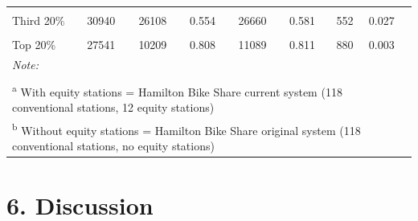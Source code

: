 \documentclass[]{elsarticle} %
\begin{document}
\begin{table}
{\begin{tabular}[t]{lccccccl}
\hspace{1em}\cellcolor{gray!6}{Second 20\%} & \cellcolor{gray!6}{33312} & \cellcolor{gray!6}{30507} & \cellcolor{gray!6}{0.555} & \cellcolor{gray!6}{31069} & \cellcolor{gray!6}{0.614} & \cellcolor{gray!6}{562} & \cellcolor{gray!6}{0.059}\\
\hspace{1em}Third 20\% & 30940 & 26108 & 0.554 & 26660 & 0.581 & 552 & 0.027\\
\hspace{1em}\cellcolor{gray!6}{Fourth 20\%} & \cellcolor{gray!6}{20185} & \cellcolor{gray!6}{6312} & \cellcolor{gray!6}{0.093} & \cellcolor{gray!6}{7435} & \cellcolor{gray!6}{0.096} & \cellcolor{gray!6}{1123} & \cellcolor{gray!6}{0.003}\\
\hspace{1em}Top 20\% & 27541 & 10209 & 0.808 & 11089 & 0.811 & 880 & 0.003\\
\bottomrule
\multicolumn{8}{l}{\rule{0pt}{1em}\textit{Note: }}\\
\multicolumn{8}{l}{\rule{0pt}{1em} }\\
\multicolumn{8}{l}{\rule{0pt}{1em}\textsuperscript{a} With equity stations = Hamilton Bike Share current system (118 conventional stations, 12 equity stations)}\\
\multicolumn{8}{l}{\rule{0pt}{1em}\textsuperscript{b} Without equity stations = Hamilton Bike Share original system (118 conventional stations, no equity stations)}\\
\end{tabular}}
\end{table}

\hypertarget{discussion}{%
\section{6. Discussion}\label{discussion}}
\end{document}
